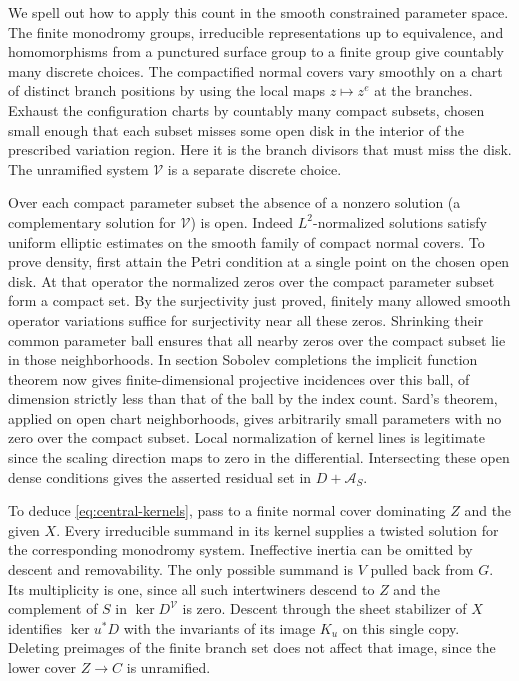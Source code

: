 We spell out how to apply this count in the smooth constrained
parameter space. The finite monodromy groups, irreducible representations
up to equivalence, and homomorphisms from a punctured surface group
to a finite group give countably many discrete choices.
The compactified normal covers vary smoothly on a chart of distinct
branch positions by using the local maps $z\mapsto z^e$ at the
branches. Exhaust the configuration charts by countably many
compact subsets, chosen small enough that each subset misses some
open disk in the interior of the prescribed variation region. Here
it is the branch divisors that must miss the disk. The unramified
system $\mathcal V$ is a separate discrete choice.

Over each compact parameter subset the absence of a nonzero solution
(a complementary solution for $\mathcal V$) is open. Indeed
$L^2$-normalized solutions satisfy uniform elliptic estimates on
the smooth family of compact normal covers. To prove density, first
attain the Petri condition at a single point on the chosen open disk.
At that operator the normalized zeros over the compact parameter
subset form a compact set. By the surjectivity just proved, finitely
many allowed smooth operator variations suffice for surjectivity near
all these zeros. Shrinking their common parameter ball ensures that
all nearby zeros over the compact subset lie in those neighborhoods.
In section Sobolev completions the implicit function theorem now
gives finite-dimensional projective incidences over this ball,
of dimension strictly less than that of the ball by the index count.
Sard's theorem, applied on open chart neighborhoods, gives arbitrarily
small parameters with no zero over the compact subset. Local
normalization of kernel lines is legitimate since the scaling
direction maps to zero in the differential. Intersecting these open
dense conditions gives the asserted residual set in $D+\mathcal A_S$.

To deduce \eqref{eq:central-kernels}, pass to a finite normal cover
dominating $Z$ and the given $X$. Every irreducible summand in
its kernel supplies a twisted solution for the corresponding
monodromy system. Ineffective inertia can be omitted by descent
and removability. The only possible summand is $V$ pulled back
from $G$. Its multiplicity is one, since all such intertwiners
descend to $Z$ and the complement of $S$ in $\ker D^{\mathcal V}$
is zero. Descent through the sheet stabilizer of $X$ identifies
$\ker u^*D$ with the invariants of its image $K_u$ on this single
copy. Deleting preimages of the finite branch set does not affect
that image, since the lower cover $Z\to C$ is unramified.

